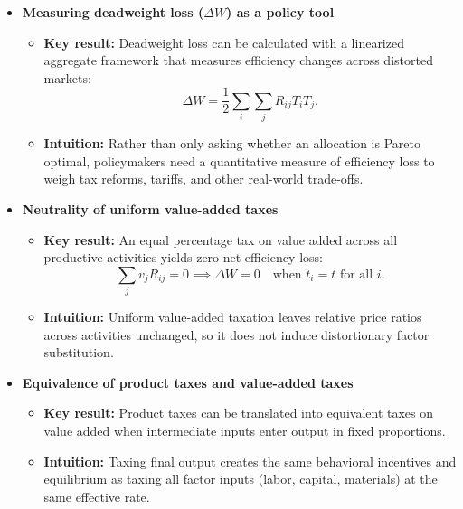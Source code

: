 \documentclass[11pt]{article}
\begin{document}
\begin{itemize}
    \item \textbf{Measuring deadweight loss ($\Delta W$) as a policy tool}
    \begin{itemize}
        \item \textbf{Key result:} Deadweight loss can be calculated with a
        linearized aggregate framework that measures efficiency changes across
        distorted markets:
        \[
        \Delta W = \frac{1}{2} \sum_{i} \sum_{j} R_{ij} T_i T_j.
        \]
        \item \textbf{Intuition:} Rather than only asking whether an allocation
        is Pareto optimal, policymakers need a quantitative measure of
        efficiency loss to weigh tax reforms, tariffs, and other real-world
        trade-offs.
    \end{itemize}

    \item \textbf{Neutrality of uniform value-added taxes}
    \begin{itemize}
        \item \textbf{Key result:} An equal percentage tax on value added across
        all productive activities yields zero net efficiency loss:
        \[
        \sum_{j} v_j R_{ij} = 0
        \implies
        \Delta W = 0
        \quad\text{when } t_i = t \text{ for all } i.
        \]
        \item \textbf{Intuition:} Uniform value-added taxation leaves relative
        price ratios across activities unchanged, so it does not induce
        distortionary factor substitution.
    \end{itemize}

    \item \textbf{Equivalence of product taxes and value-added taxes}
    \begin{itemize}
        \item \textbf{Key result:} Product taxes can be translated into
        equivalent taxes on value added when intermediate inputs enter output
        in fixed proportions.
        \item \textbf{Intuition:} Taxing final output creates the same
        behavioral incentives and equilibrium as taxing all factor inputs
        (labor, capital, materials) at the same effective rate.
    \end{itemize}


\end{itemize}
\end{document}
